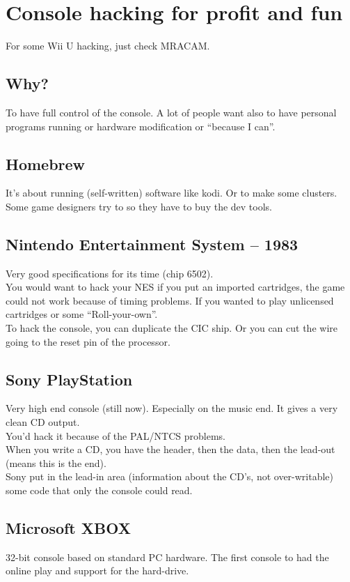 \section{Console hacking for profit and fun}
For some Wii U hacking, just check MRACAM.\\
\subsection{Why?}
To have full control of the console. A lot of people want also to have personal programs running or hardware modification or \enquote{because I can}.\\
\subsection{Homebrew}
It's about running (self-written) software like kodi. Or to make some clusters.\\
Some game designers try to so they have to buy the dev tools.\\
\subsection{Nintendo Entertainment System -- 1983}
Very good specifications for its time (chip 6502).\\
You would want to hack your NES if you put an imported cartridges, the game could not work because of timing problems. If you wanted to play unlicensed cartridges or some \enquote{Roll-your-own}.\\
To hack the console, you can duplicate the CIC ship. Or you can cut the wire going to the reset pin of the processor.
\subsection{Sony PlayStation}
Very high end console (still now). Especially on the music end. It gives a very clean CD output.\\
You'd hack it because of the PAL/NTCS problems.\\
When you write a CD, you have the header, then the data, then the lead-out (means this is the end).\\
Sony put in the lead-in area (information about the CD's, not over-writable) some code that only the console could read.
\subsection{Microsoft XBOX}
32-bit console based on standard PC hardware. The first console to had the online play and support for the hard-drive.
